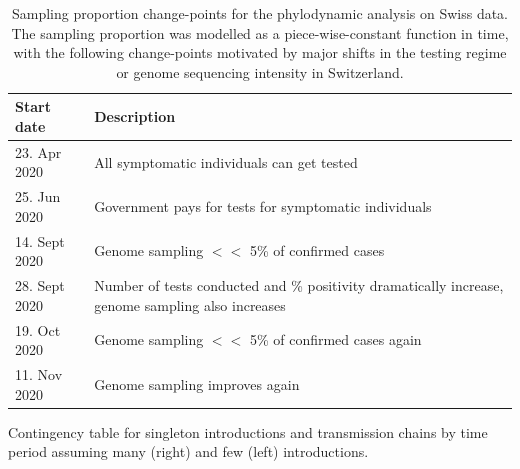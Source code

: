 \documentclass[9pt,twoside,lineno]{pnas-new}
\begin{document}
\begin{table}[h!]
\caption{Sampling proportion change-points for the phylodynamic analysis on Swiss data. The sampling proportion was modelled as a piece-wise-constant function in time, with the following change-points motivated by major shifts in the testing regime or genome sequencing intensity in Switzerland.}
\label{tab:CHE_samp_prob_change_dates}
\begin{tabular}{ll}
\hline
Start date & Description \\
\hline
23. Apr 2020 & All symptomatic individuals can get tested \\
25. Jun 2020 & Government pays for tests for symptomatic individuals \\
14. Sept 2020 & Genome sampling $<<$ 5\% of confirmed cases \\
28. Sept 2020 & Number of tests conducted and \% positivity dramatically increase, genome sampling also increases \\
19. Oct 2020 & Genome sampling $<<$ 5\% of confirmed cases again \\
11. Nov 2020 & Genome sampling improves again \\
\hline
\end{tabular}
\end{table}

\begin{table}[h!]
\caption{Contingency table for singleton introductions and transmission chains by time period assuming many (right) and few (left)  introductions.}
\label{tab:lockdown-contingency}


\end{table}




\printbibliography{}
\end{document}
